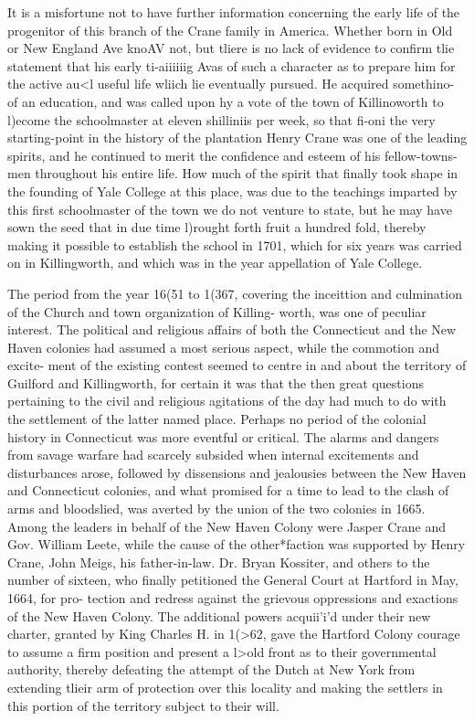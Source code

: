 \documentclass{book}
\begin{document}
It is a misfortune not to have further information concerning 
the early life of the progenitor of this branch of the Crane family 
in America. Whether born in Old or New England Ave knoAV not, 
but tliere is no lack of evidence to confirm tlie statement that his 
early ti-aiiiiiig Avas of such a character as to prepare him for the 
active au<l useful life wliich lie eventually pursued. He acquired
somethino- of an education, and was called upon hy a vote of the 
town of Killinoworth to l)ecome the schoolmaster at eleven shilliniis 
per week, so that fi-oni the very starting-point in the history of 
the plantation Henry Crane was one of the leading spirits, and he 
continued to merit the confidence and esteem of his fellow-towns- 
men throughout his entire life. How much of the spirit that 
finally took shape in the founding of Yale College at this place, 
was due to the teachings imparted by this first schoolmaster of 
the town we do not venture to state, but he may have sown the 
seed that in due time l)rought forth fruit a hundred fold, thereby 
making it possible to establish the school in 1701, which for six 
years was carried on in Killingworth, and which was in the year 
appellation of Yale College. 

The period from the year 16(51 to 1(367, covering the inceittion 
and culmination of the Church and town organization of Killing- 
worth, was one of peculiar interest. The political and religious 
affairs of both the Connecticut and the New Haven colonies had 
assumed a most serious aspect, while the commotion and excite- 
ment of the existing contest seemed to centre in and about the 
territory of Guilford and Killingworth, for certain it was that the 
then great questions pertaining to the civil and religious agitations 
of the day had much to do with the settlement of the latter named 
place. Perhaps no period of the colonial history in Connecticut 
was more eventful or critical. The alarms and dangers from 
savage warfare had scarcely subsided when internal excitements 
and disturbances arose, followed by dissensions and jealousies 
between the New Haven and Connecticut colonies, and what 
promised for a time to lead to the clash of arms and bloodslied, 
was averted by the union of the two colonies in 1665. Among 
the leaders in behalf of the New Haven Colony were Jasper Crane 
and Gov. William Leete, while the cause of the other*faction was 
supported by Henry Crane, John Meigs, his father-in-law. Dr. 
Bryan Kossiter, and others to the number of sixteen, who finally 
petitioned the General Court at Hartford in May, 1664, for pro- 
tection and redress against the grievous oppressions and exactions 
of the New Haven Colony. The additional powers acquii'i'd 
under their new charter, granted by King Charles H. in 1(>62, 
gave the Hartford Colony courage to assume a firm position and 
present a l>old front as to their governmental authority, thereby 
defeating the attempt of the Dutch at New York from extending 
tlieir arm of protection over this locality and making the settlers 
in this portion of the territory subject to their will. 
\end{document}
